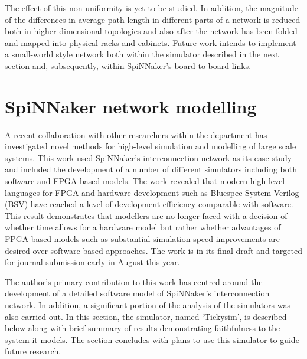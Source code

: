 			The effect of this non-uniformity is yet to be studied. In addition, the
			magnitude of the differences in average path length in different parts of
			a network is reduced both in higher dimensional topologies and also after
			the network has been folded and mapped into physical racks and cabinets.
			Future work intends to implement a small-world style network both within
			the simulator described in the next section and, subsequently, within
			SpiNNaker's board-to-board links.
	
	
	\section{SpiNNaker network modelling}
		
		
		A recent collaboration with other researchers within the department has
		investigated novel methods for high-level simulation and modelling of large
		scale systems. This work used SpiNNaker's interconnection network as its
		case study and included the development of a number of different simulators
		including both software and FPGA-based models. The work revealed that modern
		high-level languages for FPGA and hardware development such as Bluespec
		System Verilog (BSV) \cite{nikhil04} have reached a level of development
		efficiency comparable with software. This result demonstrates that modellers
		are no-longer faced with a decision of whether time allows for a hardware
		model but rather whether advantages of FPGA-based models such as substantial
		simulation speed improvements are desired over software based approaches.
		The work is in its final draft and targeted for journal submission early in
		August this year.
		
		The author's primary contribution to this work has centred around the
		development of a detailed software model of SpiNNaker's interconnection
		network. In addition, a significant portion of the analysis of the
		simulators was also carried out. In this section, the simulator, named
		`Tickysim', is described below along with brief summary of results
		demonstrating faithfulness to the system it models. The section concludes
		with plans to use this simulator to guide future research.
		
